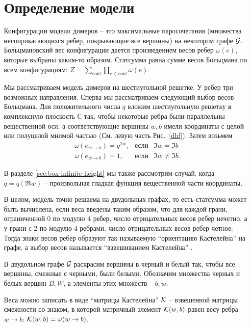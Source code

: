 \documentclass{article}
\begin{document}
\section{Определение модели}
\label{sec:model-definition}

Конфигурации модели димеров -- это максимальные паросочетания (множества несоприкасающихся ребер,
покрывающие все вершины) на некотором графе ${\cal G}$. Больцмановский вес конфигурации дается
произведением весов ребер  $\omega(e)$, которые выбраны каким-то образом. Статсумма равна сумме
весов Больцмана по всем конфигурациям: $Z=\sum_{\mathrm{conf}}\prod_{e\in\mathrm{conf}}\omega(e).$

Мы рассматриваем модель димеров на шестиугольной решетке. У ребер три возможных направления. Сперва
мы рассматриваем следующий выбор весов Больцмана. Для положительного числа $q$ вложим шестиугольную
решетку в комплексную плоскость $\mathbb{C}$ так, чтобы некоторые ребра были параллельны
вещественной оси, а соответствующие вершины  $w,b$ имели координаты с целой или полуцелой мнимой
частью (См. левую часть Рис.~\ref{dhf}). Затем возьмем 
\begin{equation}
  \label{eq:18}
  \begin{array}{lll}
 \omega(e_{w\to b})=q^{\Im w},&  \mbox{если} & \Im w=\Im b\\
  \omega(e_{w\to b})=1, & \mbox{если}& \Im w\neq\Im b.
  \end{array}
\end{equation}

В разделе  \ref{sec:box-infinite-height} мы также рассмотрим случай, когда  $q=q(\Re w)$  --
произвольная гладкая функция вещественной части координаты. 

В целом, модель точно решаема на двудольных графах, то есть статсумма может быть вычислена, если
веса введены таким образом, что для каждой грани, ограниченной 0 по модулю 4 ребер, число
отрицательных весов ребер нечетно, а у грани с 2 по модулю 4 ребрами, число отрицательных весов
ребер четное. Тогда знаки весов ребер образуют так называемую ``ориентацию Кастелейна'' на графе, а
выбор весов называется ``взвешиванием Кастелейна'' \cite{kenyon2001dominos,kenyon2009lectures}.

В двудольном графе ${\cal G}$ раскрасим вершины в черный и белый так, чтобы все вершины, смежные с черными,
были белыми. Обозначим множества черных и белых вершин  $B, W$, а элементы этих множеств --  $b,w$.

Веса можно записать в виде ``матрицы Кастелейна''  ${\cal K}$ -- взвешенной матрицы смежности со
знаком, в которой матричный элемент  ${\cal K}(w,b)$ равен весу ребра  $w\to b$: ${\cal
  K}(w,b)=\omega(w\to b)$. 
\end{document}
